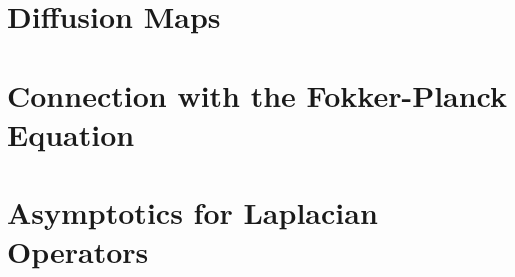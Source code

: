 \documentclass[11pt]{report}
\begin{document}
\chapter{Diffusion Maps}\label{chap:diffusionMaps}


\chapter{Connection with the Fokker-Planck Equation}\label{chap:fokkerPlanck}


\appendix
\chapter{Asymptotics for Laplacian Operators}




\end{document}
